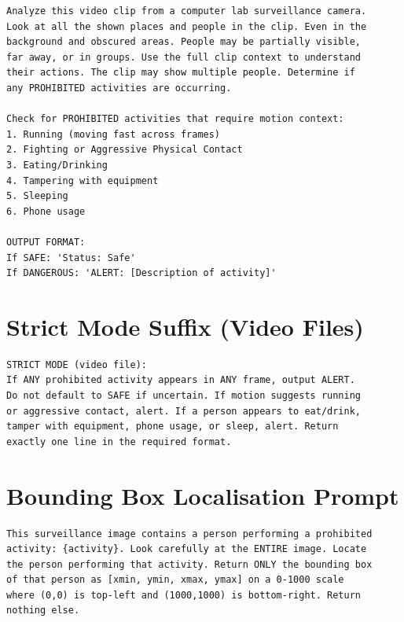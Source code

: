 \documentclass[12pt,a4paper]{article}
\begin{document}
\begin{lstlisting}[language={}, numbers=none, breaklines=true, basicstyle=\ttfamily\small]
Analyze this video clip from a computer lab surveillance camera.
Look at all the shown places and people in the clip. Even in the
background and obscured areas. People may be partially visible,
far away, or in groups. Use the full clip context to understand
their actions. The clip may show multiple people. Determine if
any PROHIBITED activities are occurring.

Check for PROHIBITED activities that require motion context:
1. Running (moving fast across frames)
2. Fighting or Aggressive Physical Contact
3. Eating/Drinking
4. Tampering with equipment
5. Sleeping
6. Phone usage

OUTPUT FORMAT:
If SAFE: 'Status: Safe'
If DANGEROUS: 'ALERT: [Description of activity]'
\end{lstlisting}

\section{Strict Mode Suffix (Video Files)}
\label{app:strict}

\begin{lstlisting}[language={}, numbers=none, breaklines=true, basicstyle=\ttfamily\small]
STRICT MODE (video file):
If ANY prohibited activity appears in ANY frame, output ALERT.
Do not default to SAFE if uncertain. If motion suggests running
or aggressive contact, alert. If a person appears to eat/drink,
tamper with equipment, phone usage, or sleep, alert. Return
exactly one line in the required format.
\end{lstlisting}

\section{Bounding Box Localisation Prompt}
\label{app:bbox}

\begin{lstlisting}[language={}, numbers=none, breaklines=true, basicstyle=\ttfamily\small]
This surveillance image contains a person performing a prohibited
activity: {activity}. Look carefully at the ENTIRE image. Locate
the person performing that activity. Return ONLY the bounding box
of that person as [xmin, ymin, xmax, ymax] on a 0-1000 scale
where (0,0) is top-left and (1000,1000) is bottom-right. Return
nothing else.
\end{lstlisting}
\end{document}
